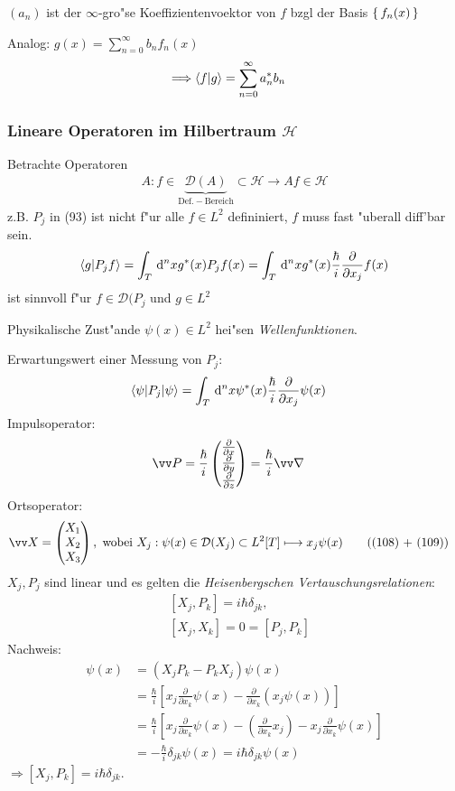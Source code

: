 \documentclass[a4paper]{scrartcl}
\begin{document}
{$(a_n)$ ist  der $\infty$-gro"se Koeffizientenvoektor von $f$ bzgl der Basis $\set{ f_n(x) }$

Analog: $g(x) = \sum_{n=0}^\infty b_n f_n(x)$
\begin{align}
\Longrightarrow \braket{f | g} & = \sum_{n=0}^\infty a_n^* b_n
\end{align}

\subsubsection*{Lineare Operatoren im Hilbertraum $\mathcal H$}
Betrachte Operatoren
\begin{align}
A: f \in \underbrace{\mathcal D(A)}_{\mathrm{Def.-Bereich}} \subset \mathcal H \longrightarrow A f \in \mathcal{H} 
\end{align}
z.B. $P_j$ in (93) ist nicht f"ur alle $f \in L^2$ defininiert, $f$ muss fast "uberall diff'bar sein.
$$\braket{g | P_j f} = \int_T \, \mathrm{d}^n x g^*(x) P_jf(x) = \int_T \, \mathrm{d}^n x g^*(x) \frac \hbar i \frac \partial{\partial x_j} f(x)$$
ist sinnvoll f"ur $f \in \mathcal D(P_j$ und $g \in L^2$

Physikalische Zust"ande $\psi(x) \in L^2$ hei"sen \emph{Wellenfunktionen}.

Erwartungswert einer Messung von $P_j$:
\begin{align}
\braket{ \psi | P_j | \psi} & = \int_T \, \mathrm{d}^nx \psi^*(x) \frac{\hbar}{i} \frac \partial {\partial x_j} \psi(x)
\end{align}
Impulsoperator:
\begin{align}
\vv P & = \frac \hbar i \matr{ \frac \partial {\partial x} \\ \frac \partial {\partial y} \\ \frac \partial {\partial z}} = \frac \hbar i \vv \nabla
\end{align}
Ortsoperator:
\begin{align}
\vv X & = \matr{ X_1 \\ X_2 \\ X_3 }, \mathrm{ \ wobei \ }
X_j: \psi(x) \in \mathcal D (X_j) \subset L^2[T] \longmapsto x_j \psi(x) \tag{(108) + (109)}
\end{align}
\setcounter{equation}{109}
$X_j, P_j$ sind linear und es gelten die \emph{Heisenbergschen Vertauschungsrelationen}:
\begin{eqnarray}
& \left[ X_j, P_k \right]  = i\hbar \delta_{jk}, \\
& \left[ X_j, X_k \right]  = 0 = [ P_j, P_k ]
\end{eqnarray}
Nachweis:
\begin{align*}
[ X_j, P_k] \psi(x) &= (X_j P_k - P_k X_j) \psi(x) \\
& = \frac \hbar i \left[ x_j \frac \partial {\partial x_k} \psi(x) - \frac \partial {\partial x_k} (x_j \psi(x)) \right] \\
& = \frac \hbar i \left[ x_j \frac \partial {\partial x_k} \psi(x) - {\left( \frac \partial {\partial x_k} x_j \right)} - x_j \frac \partial {\partial x_k} \psi(x) \right] \\
& = - \frac \hbar i \delta_{jk} \psi(x) = i \hbar \delta_{jk} \psi(x)
\end{align*}
$\Longrightarrow [X_j, P_k] = i \hbar \delta_{jk}$.

}
\end{document}
